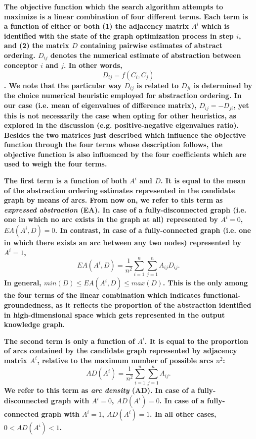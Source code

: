 \textbf{The objective function which the search algorithm attempts to maximize is a linear combination of four different terms. Each term is a function of either or both (1) the adjacency matrix $A^i$ which is identified with the state of the graph optimization process in step $i$, and (2) the matrix $D$ containing pairwise estimates of abstract ordering. $D_{ij}$ denotes the numerical estimate of abstraction between conceptor $i$ and $j$. In other words, $$D_{ij} = f(C_i, C_j)$$. We note that the particular way $D_{ij}$ is related to $D_{ji}$ is determined by the choice numerical heuristic employed for abstraction ordering. In our case (i.e. mean of eigenvalues of difference matrix), $D_{ij} = -D_{ji}$, yet this is not necessarily the case when opting for other heuristics, as explored in the discussion (e.g. positive-negative eigenvalues ratio). Besides the two matrices just described which influence the objective function through the four terms whose description follows, the objective function is also influenced by the four coefficients which are used to weigh the four terms.}

\textbf{The first term is a function of both $A^i$ and $D$. It is equal to the mean of the abstraction ordering estimates represented in the candidate graph by means of arcs. From now on, we refer to this term as \textit{expressed abstraction} (EA). In case of a fully-disconnected graph (i.e. one in which no arc exists in the graph at all) represented by $A^i = 0$, $EA(A^i, D) = 0$. In contrast, in case of a fully-connected graph (i.e. one in which there exists an arc between any two nodes) represented by $A^i = 1$, $$EA(A^i, D) = \frac{1}{n^2} \sum_{i=1}^{n} \sum_{j=1}^{n} A_{ij} D_{ij}.$$ In general, $min(D) \leq EA(A^i, D) \leq max(D)$. This is the only among the four terms of the linear combination which indicates functional-groundedness, as it reflects the proportion of the abstraction identified in high-dimensional space which gets represented in the output knowledge graph.}

\textbf{The second term is only a function of $A^i$. It is equal to the proportion of arcs contained by the candidate graph represented by adjacency matrix $A^i$, relative to the maximum number of possible arcs $n^2$: $$AD(A^i) = \frac{1}{n^2} \sum_{i=1}^{n} \sum_{j=1}^{n} A_{ij}.$$ We refer to this term as \textit{arc density} (AD). In case of a fully-disconnected graph with $A^i = 0$, $AD(A^i) = 0$. In case of a fully-connected graph with $A^i = 1$, $AD(A^i) = 1$. In all other cases, $0 < AD(A^i) < 1$.}


